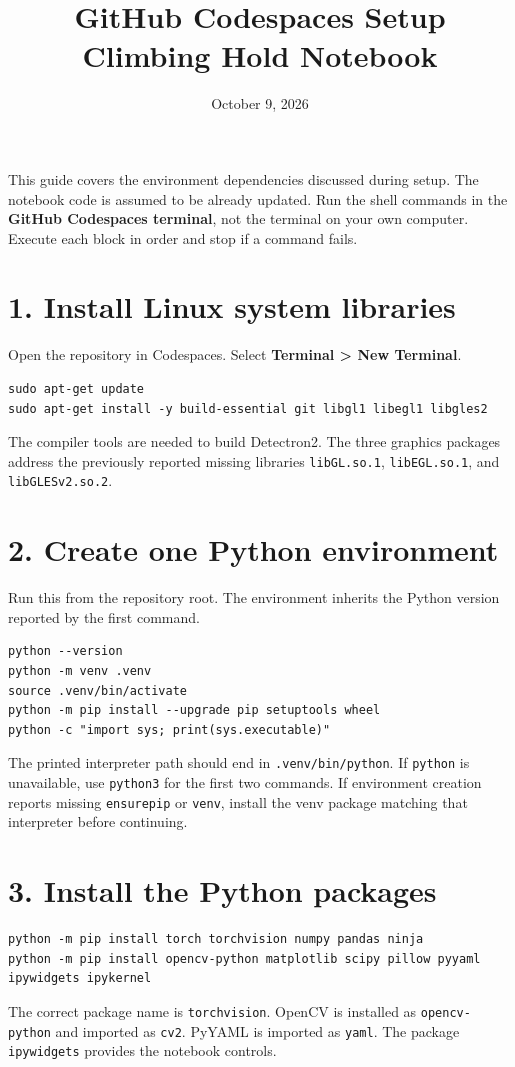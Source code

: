 \documentclass[10pt]{article}
\title{GitHub Codespaces Setup\\Climbing Hold Notebook}
\author{}
\date{October 9, 2026}
\begin{document}
\maketitle
\vspace{-1.7em}
This guide covers the environment dependencies discussed during setup. The notebook code is assumed to be already updated. Run the shell commands in the \textbf{GitHub Codespaces terminal}, not the terminal on your own computer. Execute each block in order and stop if a command fails.

\section*{1. Install Linux system libraries}
Open the repository in Codespaces. Select \textbf{Terminal > New Terminal}.
\begin{lstlisting}
sudo apt-get update
sudo apt-get install -y build-essential git libgl1 libegl1 libgles2
\end{lstlisting}
The compiler tools are needed to build Detectron2. The three graphics packages address the previously reported missing libraries \texttt{libGL.so.1}, \texttt{libEGL.so.1}, and \texttt{libGLESv2.so.2}.

\section*{2. Create one Python environment}
Run this from the repository root. The environment inherits the Python version reported by the first command.
\begin{lstlisting}
python --version
python -m venv .venv
source .venv/bin/activate
python -m pip install --upgrade pip setuptools wheel
python -c "import sys; print(sys.executable)"
\end{lstlisting}
The printed interpreter path should end in \texttt{.venv/bin/python}.
If \texttt{python} is unavailable, use \texttt{python3} for the first two commands. If environment creation reports missing \texttt{ensurepip} or \texttt{venv}, install the venv package matching that interpreter before continuing.

\section*{3. Install the Python packages}
\begin{lstlisting}
python -m pip install torch torchvision numpy pandas ninja
python -m pip install opencv-python matplotlib scipy pillow pyyaml ipywidgets ipykernel
\end{lstlisting}
The correct package name is \texttt{torchvision}. OpenCV is installed as \texttt{opencv-python} and imported as \texttt{cv2}. PyYAML is imported as \texttt{yaml}. The package \texttt{ipywidgets} provides the notebook controls.
\end{document}
